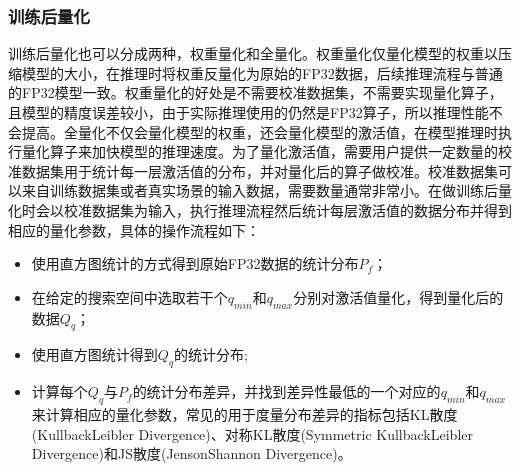 \documentclass[letterpaper,10pt,english]{sphinxmanual}
\begin{document}
\subsubsection{训练后量化}
\label{\detokenize{chapter_model_deployment/model_compression:id4}}
\sphinxAtStartPar
训练后量化也可以分成两种，权重量化和全量化。权重量化仅量化模型的权重以压缩模型的大小，在推理时将权重反量化为原始的FP32数据，后续推理流程与普通的FP32模型一致。权重量化的好处是不需要校准数据集，不需要实现量化算子，且模型的精度误差较小，由于实际推理使用的仍然是FP32算子，所以推理性能不会提高。全量化不仅会量化模型的权重，还会量化模型的激活值，在模型推理时执行量化算子来加快模型的推理速度。为了量化激活值，需要用户提供一定数量的校准数据集用于统计每一层激活值的分布，并对量化后的算子做校准。校准数据集可以来自训练数据集或者真实场景的输入数据，需要数量通常非常小。在做训练后量化时会以校准数据集为输入，执行推理流程然后统计每层激活值的数据分布并得到相应的量化参数，具体的操作流程如下：
\begin{itemize}
\item {} 
\sphinxAtStartPar
使用直方图统计的方式得到原始FP32数据的统计分布\(P_f\)；

\item {} 
\sphinxAtStartPar
在给定的搜索空间中选取若干个\(q_{min}\)和\(q_{max}\)分别对激活值量化，得到量化后的数据\(Q_q\)；

\item {} 
\sphinxAtStartPar
使用直方图统计得到\(Q_q\)的统计分布;

\item {} 
\sphinxAtStartPar
计算每个\(Q_q\)与\(P_f\)的统计分布差异，并找到差异性最低的一个对应的\(q_{min}\)和\(q_{max}\)来计算相应的量化参数，常见的用于度量分布差异的指标包括KL散度(Kullback\sphinxhyphen{}Leibler
Divergence)、对称KL散度(Symmetric Kullback\sphinxhyphen{}Leibler
Divergence)和JS散度(Jenson\sphinxhyphen{}Shannon Divergence)。

\end{itemize}
\end{document}
